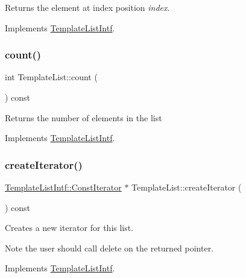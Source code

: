 Returns the element at index position {\itshape index}. 

Implements \mbox{\hyperlink{class_template_list_intf_aa51e57e72eacf4e8ce1055ee30a0f7f8}{Template\+List\+Intf}}.

\mbox{\label{class_template_list_a30e405b8e59795bd9e9f2fa2b36b6bd0}} 
\subsubsection{\texorpdfstring{count()}{count()}}
{\footnotesize\ttfamily int Template\+List\+::count (\begin{DoxyParamCaption}{ }\end{DoxyParamCaption}) const\hspace{0.3cm}{\ttfamily [virtual]}}

Returns the number of elements in the list 

Implements \mbox{\hyperlink{class_template_list_intf_a329e49e33484c2aa5106aac1bf4e5216}{Template\+List\+Intf}}.

\mbox{\label{class_template_list_aeadbcac8450e3822ef3beec0983a2a55}} 
\subsubsection{\texorpdfstring{createIterator()}{createIterator()}}
{\footnotesize\ttfamily \mbox{\hyperlink{class_template_list_intf_1_1_const_iterator}{Template\+List\+Intf\+::\+Const\+Iterator}} $\ast$ Template\+List\+::create\+Iterator (\begin{DoxyParamCaption}{ }\end{DoxyParamCaption}) const\hspace{0.3cm}{\ttfamily [virtual]}}

Creates a new iterator for this list. \begin{DoxyNote}{Note}
the user should call delete on the returned pointer. 
\end{DoxyNote}


Implements \mbox{\hyperlink{class_template_list_intf_a56b82384db24c3e121076a1da046d378}{Template\+List\+Intf}}.

\mbox{\label{class_template_list_aeff3b4d0cf58bc2bd92de00c51cde488}} 
